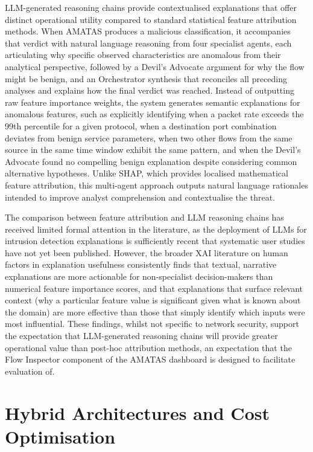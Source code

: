 \documentclass[../main.tex]{subfiles}
\begin{document}
LLM-generated reasoning chains provide contextualised explanations that offer distinct operational utility compared to standard statistical feature attribution methods. When AMATAS produces a malicious classification, it accompanies that verdict with natural language reasoning from four specialist agents, each articulating why specific observed characteristics are anomalous from their analytical perspective, followed by a Devil's Advocate argument for why the flow might be benign, and an Orchestrator synthesis that reconciles all preceding analyses and explains how the final verdict was reached. Instead of outputting raw feature importance weights, the system generates semantic explanations for anomalous features, such as explicitly identifying when a packet rate exceeds the 99th percentile for a given protocol, when a destination port combination deviates from benign service parameters, when two other flows from the same source in the same time window exhibit the same pattern, and when the Devil's Advocate found no compelling benign explanation despite considering common alternative hypotheses. Unlike SHAP, which provides localised mathematical feature attribution, this multi-agent approach outputs natural language rationales intended to improve analyst comprehension and contextualise the threat.

The comparison between feature attribution and LLM reasoning chains has received limited formal attention in the literature, as the deployment of LLMs for intrusion detection explanations is sufficiently recent that systematic user studies have not yet been published. However, the broader XAI literature on human factors in explanation usefulness \autocite{Lage2019,Chromik2021} consistently finds that textual, narrative explanations are more actionable for non-specialist decision-makers than numerical feature importance scores, and that explanations that surface relevant context (why a particular feature value is significant given what is known about the domain) are more effective than those that simply identify which inputs were most influential. These findings, whilst not specific to network security, support the expectation that LLM-generated reasoning chains will provide greater operational value than post-hoc attribution methods, an expectation that the Flow Inspector component of the AMATAS dashboard is designed to facilitate evaluation of.

\section{Hybrid Architectures and Cost Optimisation}
\label{sec:hybrid-architectures}
\end{document}
